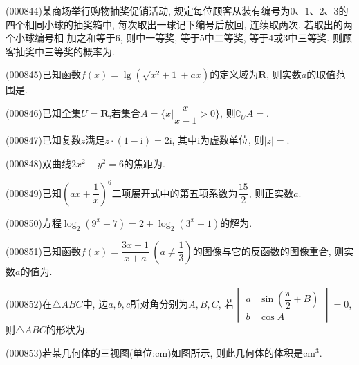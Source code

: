 \item (000844)某商场举行购物抽奖促销活动, 规定每位顾客从装有编号为$0$、$1$、$2$、$3$的四个相同小球的抽奖箱中, 每次取出一球记下编号后放回, 连续取两次, 若取出的两个小球编号相
加之和等于$6$, 则中一等奖, 等于$5$中二等奖, 等于$4$或$3$中三等奖. 则顾客抽奖中三等奖的概率为.
\item (000845)已知函数$f(x)=\lg (\sqrt{x^2+1}+ax)$的定义域为$\mathbf{R}$, 则实数$a$的取值范围是.
\item (000846)已知全集$U=\mathbf{R}$,若集合$A=\{x|\dfrac x{x-1}>0\}$, 则$\complement_U A=$.
\item (000847)已知复数$z$满足$z\cdot (1-\mathrm{i})=2\mathrm{i}$, 其中$\mathrm{i}$为虚数单位, 则$|z|=$.
\item (000848)双曲线$2 x^2-y^2=6$的焦距为.
\item (000849)已知$(ax+\dfrac1x)^6$二项展开式中的第五项系数为$\dfrac{15}2$, 则正实数$a$.
\item (000850)方程$\log_2(9^x+7)=2+\log_2(3^x+1)$的解为.
\item (000851)已知函数$f(x)=\dfrac{3x+1}{x+a}\ (a\ne \dfrac13)$的图像与它的反函数的图像重合, 则实数$a$的值为.
\item (000852)在$\triangle ABC$中, 边$a,b,c$所对角分别为$A,B,C$, 若$\begin{vmatrix} a & \sin (\dfrac{\pi}2+B)  \\ b & \cos A  \end{vmatrix}=0$, 则$\triangle ABC$的形状为.
\item (000853)若某几何体的三视图(单位:$\text{cm}$)如图所示, 则此几何体的体积是$\text{cm}^3$.
